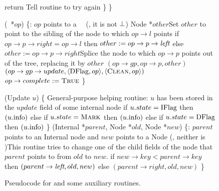 \begin{figure*}
\begin{code}
		return \FALSE\tabtabcom Tell  routine to try again\nlc
		\p       \}\nlc
		\p
		\}\bl
		\nlc
		
		(\DFlag\ *$op$) \{\ul
		\n   {}:  $op$ points to a \DFlag\ \record\  (\ie, it is not $\mbox{$\bot$}$)\nlc
		Node *$other$\bl\ul
		\com Set $other$ to point to the sibling of the node to which  $op\rightarrow l$ points \nlc
		if $op\rightarrow p\rightarrow right = op\rightarrow l$ then $other := op\rightarrow p \rightarrow \mbox{\it left}$ else $other:=op\rightarrow p\rightarrow right$\label{read-other}\ul 
		\com Splice the node to which $op\rightarrow p$ points out of the tree, replacing it by $other$\nlc
		$(op\rightarrow gp, op\rightarrow p, other)$ \label{dchild-cas}\nlc
		\CASB$(op\rightarrow gp\rightarrow update, \langle \mbox{DFlag}, op\rangle, \langle \mbox{\sc Clean}, op\rangle)$ \label{dunflag-cas}\nlc
		\textcolor{blue}{$op \rightarrow complete := \mbox{\sc True}$}  \nlc
		\p
		\}\bl\nlc
		
		(Update $u$) \{ \tabtabcom General-purpose helping routine\ul
		\n    {}:  $u$ has been stored in the $update$ field of some internal node\nlc
		if $u.state = \mbox{IFlag}$ then $(u.\mbox{info})$\label{call-HelpInsert}\nlc
		else if $u.state = \mbox{\sc Mark}$ then $(u.\mbox{info})$\label{call-hm2}\nlc
		else if $u.state = \mbox{DFlag}$ then $(u.\mbox{info})$\label{call-HelpDelete}\nlc
		\p
		\}\bl
		\nlc
		(Internal *$parent$, Node *$old$, Node *$new$) \{\label{CAS-Child}\ul
		\n  {}:  $parent$ points to an Internal node and $new$ points to a Node (\ie, neither is \NULL)\ul
		\com This routine tries to change one of the child fields of the node that $parent$ points to from $old$ to $new$.\nlc
		if $new \rightarrow key < parent\rightarrow key$ then\label{which-child}\nlc
		\n       \CASB$(parent\rightarrow \mbox{\it left}, old, new)$\label{child-cas-1}\nlc
		\p  else\nlc
		\n       \CASB$(parent\rightarrow right, old, new)$\label{child-cas-2}\nlc
		\p\p 
		\}
	\end{code}
	\caption{\label{code3}Pseudocode for  and some auxiliary routines.}
\end{figure*}